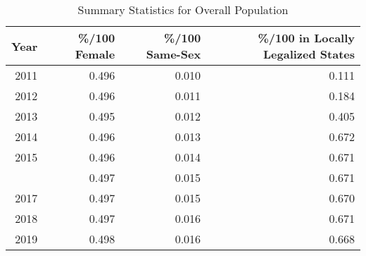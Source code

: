 \begin{table}

\caption{Summary Statistics for Overall Population}
\centering
\begin{tabular}[t]{rrrr}
\toprule
Year & \%/100 Female & \%/100 Same-Sex & \%/100 in Locally Legalized States\\
\midrule
2011 & 0.496 & 0.010 & 0.111\\
2012 & 0.496 & 0.011 & 0.184\\
2013 & 0.495 & 0.012 & 0.405\\
2014 & 0.496 & 0.013 & 0.672\\
2015 & 0.496 & 0.014 & 0.671\\
\addlinespace
2016 & 0.497 & 0.015 & 0.671\\
2017 & 0.497 & 0.015 & 0.670\\
2018 & 0.497 & 0.016 & 0.671\\
2019 & 0.498 & 0.016 & 0.668\\
\bottomrule
\end{tabular}
\end{table}
